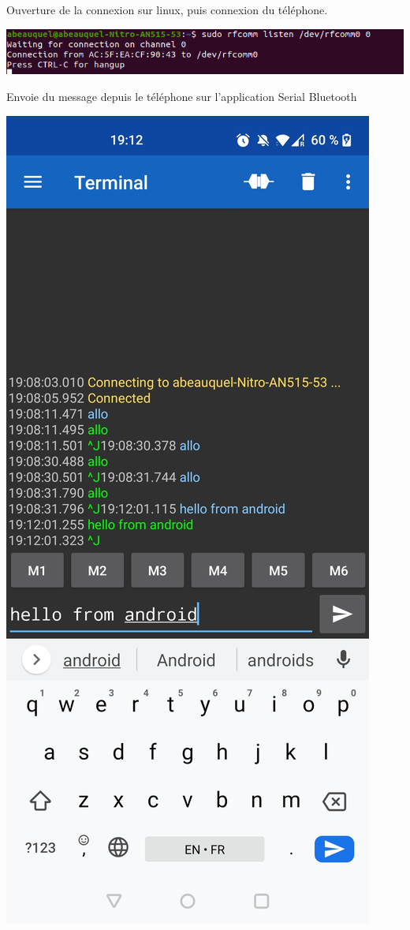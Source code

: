 \documentclass[12pt,fleqn]{article}
\begin{document}
Ouverture de la connexion sur linux, puis connexion du téléphone.

\includegraphics[scale=0.7]{images/rfcomm_connection_linux.png}


Envoie du message depuis le téléphone sur l'application Serial Bluetooth

\includegraphics[scale=0.1]{images/rfcomm_telephone_message.jpg}
\end{document}
